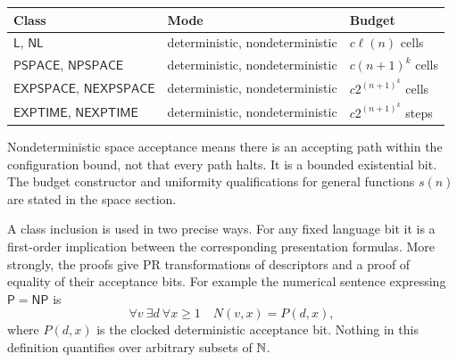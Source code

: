 \begin{center}
\begin{tabular}{lll}
\toprule
Class & Mode & Budget \\
\midrule
$\mathsf L$, $\mathsf{NL}$ & deterministic, nondeterministic & $c\ell(n)$ cells \\
$\mathsf{PSPACE}$, $\mathsf{NPSPACE}$ & deterministic, nondeterministic & $c(n+1)^k$ cells \\
$\mathsf{EXPSPACE}$, $\mathsf{NEXPSPACE}$ & deterministic, nondeterministic & $c2^{(n+1)^k}$ cells \\
$\mathsf{EXPTIME}$, $\mathsf{NEXPTIME}$ & deterministic, nondeterministic & $c2^{(n+1)^k}$ steps \\
\bottomrule
\end{tabular}
\end{center}
Nondeterministic space acceptance means there is an accepting path within the configuration bound, not that every path halts. It is a bounded existential bit. The budget constructor and uniformity qualifications for general functions $s(n)$ are stated in the space section.

A class inclusion is used in two precise ways. For any fixed language bit it is a first-order implication between the corresponding presentation formulas. More strongly, the proofs give PR transformations of descriptors and a proof of equality of their acceptance bits. For example the numerical sentence expressing $\mathsf P=\mathsf{NP}$ is
\[
 \forall v\ \exists d\ \forall x\ge1\quad N(v,x)=P(d,x),
\]
where $P(d,x)$ is the clocked deterministic acceptance bit. Nothing in this definition quantifies over arbitrary subsets of $\mathbb N$.

